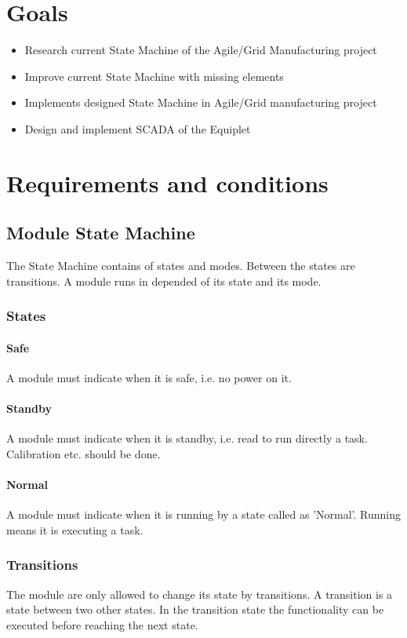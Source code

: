 \documentclass[12pt,a4paper]{report}
\begin{document}
\section{Goals}
\begin{itemize}
\item Research current State Machine of the Agile/Grid Manufacturing project
\item Improve current State Machine with missing elements
\item Implements designed State Machine in Agile/Grid manufacturing project 
\item Design and implement SCADA of the Equiplet
\end{itemize}

\newpage
\section{Requirements and conditions}

\subsection{Module State Machine}
The State Machine contains of states and modes. Between the states are transitions. A module runs in depended of its state and its mode.

\subsubsection{States}
\paragraph{Safe}A module must indicate when it is safe, i.e. no power on it.
\paragraph{Standby}A module must indicate when it is standby, i.e. read to run directly a task. Calibration etc. should be done.
\paragraph{Normal}A module must indicate when it is running by a state called as 'Normal'. Running means it is executing a task.

\subsubsection{Transitions}
The module are only allowed to change its state by transitions. A transition is a state between two other states. In the transition state the functionality can be executed before reaching the next state.
\end{document}
